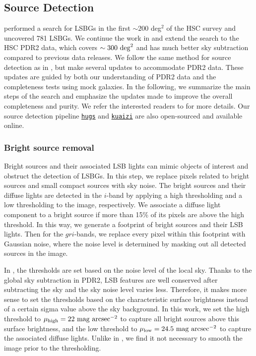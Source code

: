 \documentclass[twocolumn,astrosymb,twocolappendix]{aastex631}
\newcommand{\sbunit}{\mathrm{mag\ arcsec}^{-2}}
\newcommand{\code}[1]{\texttt{#1}}
\begin{document}
\begin{CJK*}{UTF8}{gbsn}
\subsection{Source Detection}\label{sec:detection}
 performed a search for LSBGs in the first $\sim 200$ deg$^2$ of the HSC survey and uncovered 781 LSBGs. We continue the work in  and extend the search to the HSC PDR2 data, which covers $\sim 300\ \rm{deg}^{2}$ and has much better sky subtraction compared to previous data releases. We follow the same method for source detection as in , but make several updates to accommodate PDR2 data. These updates are guided by both our understanding of PDR2 data and the completeness tests using mock galaxies. In the following, we summarize the main steps of the search and emphasize the updates made to improve the overall completeness and purity. We refer the interested readers to  for more details. Our source detection pipeline \href{https://github.com/johnnygreco/hugs}{\code{hugs}} and \href{https://github.com/AstroJacobLi/kuaizi}{\code{kuaizi}} are also open-sourced and available online.

\subsubsection{Bright source removal}
Bright sources and their associated LSB lights can mimic objects of interest and obstruct the detection of LSBGs. In this step, we replace pixels related to bright sources and small compact sources with sky noise. The bright sources and their diffuse lights are detected in the $i$-band by applying a high thresholding and a low thresholding to the image, respectively. We associate a diffuse light component to a bright source if more than 15\% of its pixels are above the high threshold. In this way, we generate a footprint of bright sources and their LSB lights. Then for the $gri$-bands, we replace every pixel within this footprint with Gaussian noise, where the noise level is determined by masking out all detected sources in the image. 
    
    In , the thresholds are set based on the noise level of the local sky. Thanks to the global sky subtraction in PDR2, LSB features are well conserved after subtracting the sky and the sky noise level varies less. Therefore, it makes more sense to set the thresholds based on the characteristic surface brightness instead of a certain sigma value above the sky background. In this work, we set the high threshold to $\mu_{\rm high} = 22\ \sbunit$ to capture all bright sources above this surface brightness, and the low threshold to $\mu_{\rm low} = 24.5\ \sbunit$ to capture the associated diffuse lights. Unlike in , we find it not necessary to smooth the image prior to the thresholding. 
    

\end{CJK*}
\end{document}
